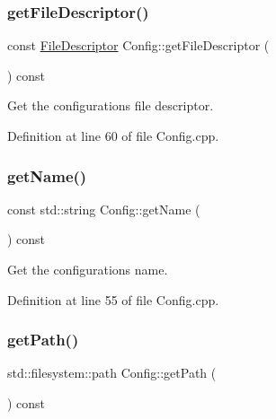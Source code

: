 \subsubsection{\texorpdfstring{get\+File\+Descriptor()}{getFileDescriptor()}}
{\footnotesize\ttfamily const \hyperlink{namespacecfg_af0aed6e47bd26e91ad7d69467f96caaf}{File\+Descriptor} Config\+::get\+File\+Descriptor (\begin{DoxyParamCaption}{ }\end{DoxyParamCaption}) const\hspace{0.3cm}{\ttfamily [noexcept]}}



Get the configuration\textquotesingle{}s file descriptor. 



Definition at line 60 of file Config.\+cpp.

\mbox{\label{classcfg_1_1_config_ac1fa619b1d5dbd0c3326ac93a4d437bb}} 
\subsubsection{\texorpdfstring{get\+Name()}{getName()}}
{\footnotesize\ttfamily const std\+::string Config\+::get\+Name (\begin{DoxyParamCaption}{ }\end{DoxyParamCaption}) const\hspace{0.3cm}{\ttfamily [noexcept]}}



Get the configuration\textquotesingle{}s name. 



Definition at line 55 of file Config.\+cpp.

\mbox{\label{classcfg_1_1_config_aec545d9dc88130f76bfb6f2a1863b22f}} 
\subsubsection{\texorpdfstring{get\+Path()}{getPath()}}
{\footnotesize\ttfamily std\+::filesystem\+::path Config\+::get\+Path (\begin{DoxyParamCaption}{ }\end{DoxyParamCaption}) const\hspace{0.3cm}{\ttfamily [noexcept]}}



